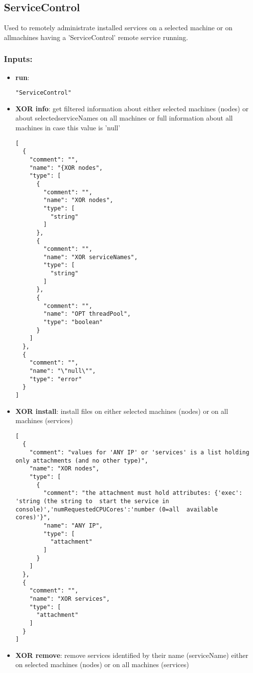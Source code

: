\subsection{ServiceControl}
Used
 to remotely administrate installed services on a selected machine or on
 allmachines having a 'ServiceControl' remote service running.
\subsubsection*{Inputs:}
\begin{itemize}
    \item \textbf{run}: 
\begin{lstlisting}
"ServiceControl"
\end{lstlisting}
    \item \textbf{XOR info}: get filtered information about either selected machines (nodes) or  about selectedserviceNames on all machines or full information about all  machines in case this value is 'null'
\begin{lstlisting}
[
  {
    "comment": "", 
    "name": "{XOR nodes", 
    "type": [
      {
        "comment": "", 
        "name": "XOR nodes", 
        "type": [
          "string"
        ]
      }, 
      {
        "comment": "", 
        "name": "XOR serviceNames", 
        "type": [
          "string"
        ]
      }, 
      {
        "comment": "", 
        "name": "OPT threadPool", 
        "type": "boolean"
      }
    ]
  }, 
  {
    "comment": "", 
    "name": "\"null\"", 
    "type": "error"
  }
]
\end{lstlisting}
    \item \textbf{XOR install}: install files on either selected machines (nodes) or on all machines (services)
\begin{lstlisting}
[
  {
    "comment": "values for 'ANY IP' or 'services' is a list holding only attachments (and no other type)", 
    "name": "XOR nodes", 
    "type": [
      {
        "comment": "the attachment must hold attributes: {'exec': 'string (the string to  start the service in console)','numRequestedCPUCores':'number (0=all  available cores)'}", 
        "name": "ANY IP", 
        "type": [
          "attachment"
        ]
      }
    ]
  }, 
  {
    "comment": "", 
    "name": "XOR services", 
    "type": [
      "attachment"
    ]
  }
]
\end{lstlisting}
    \item \textbf{XOR remove}: remove services identified by their name (serviceName) either on selected machines (nodes) or on all machines (services)

\end{itemize}
